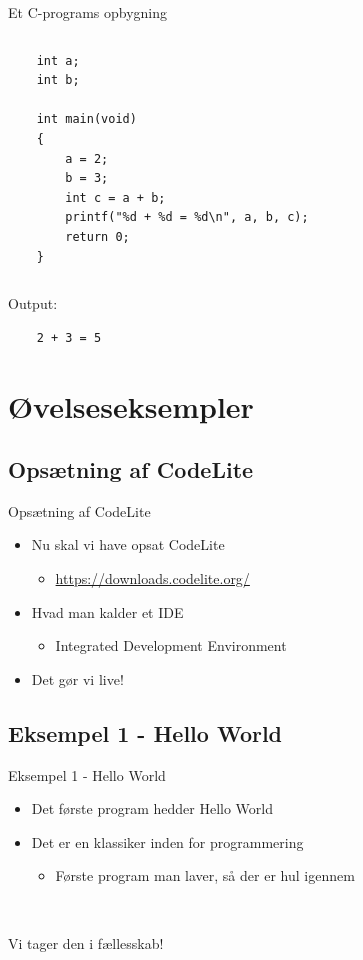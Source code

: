 \documentclass{beamer}
\begin{document}
\begin{frame}[fragile]{Et C-programs opbygning}
\begin{columns}
\begin{column}{0.4\textwidth}
\begin{lstlisting}
	int a;
	int b;	
	
	int main(void)
	{
		a = 2;
		b = 3;
		int c = a + b;
		printf("%d + %d = %d\n", a, b, c);
		return 0;
	}
	\end{lstlisting}
	\end{column}
	
	\end{columns}
	\begin{center}
	Output:
	\lstset{language=bash, numbers=none}
	\begin{lstlisting}
	2 + 3 = 5 
	\end{lstlisting}
	\end{center}
\end{frame}

\section{Øvelseseksempler}
\subsection{Opsætning af CodeLite}
\begin{frame}{Opsætning af CodeLite}
	\begin{itemize}
	\item{Nu skal vi have opsat CodeLite}
	\begin{itemize}
		\item{\url{https://downloads.codelite.org/}}
		\end{itemize}
	\item{Hvad man kalder et IDE}
		\begin{itemize}
		\item{Integrated Development Environment}
		\end{itemize}
	\item{Det gør vi live!}
	\end{itemize}
\end{frame}

\subsection{Eksempel 1 - Hello World}
\begin{frame}{Eksempel 1 - Hello World}
	\begin{itemize}
	\item{Det første program hedder Hello World}
	\item{Det er en klassiker inden for programmering}
		\begin{itemize}
		\item{Første program man laver, så der er hul igennem}
		\end{itemize}
	\end{itemize}
	\
	\item{Vi tager den i fællesskab!}
\end{frame}
\end{document}
